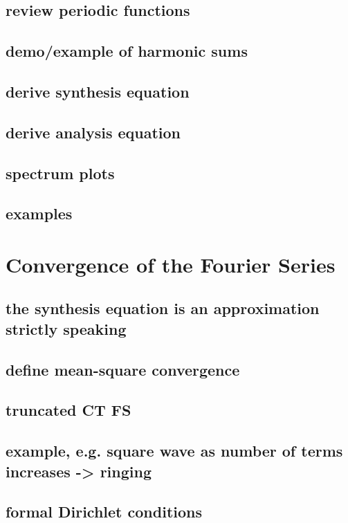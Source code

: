 \documentclass{article}
\begin{document}
\subsection{review periodic functions}
\label{sec:org5c98599}
\subsection{demo/example of harmonic sums}
\label{sec:orgdc9161b}
\subsection{derive synthesis equation}
\label{sec:org9d67cc2}
\subsection{derive analysis equation}
\label{sec:org186dd6d}
\subsection{spectrum plots}
\label{sec:orgea0d486}
\subsection{examples}
\label{sec:orgda563b3}

\newpage
\section{Convergence of the Fourier Series}
\label{sec:org0a6d2d4}
\subsection{the synthesis equation is an approximation strictly speaking}
\label{sec:orge86364a}
\subsection{define mean-square convergence}
\label{sec:org992f2f9}
\subsection{truncated CT FS}
\label{sec:org1a31840}
\subsection{example, e.g. square wave as number of terms increases -> ringing}
\label{sec:org5b9a020}
\subsection{formal Dirichlet conditions}
\label{sec:orgd932eed}
\end{document}
